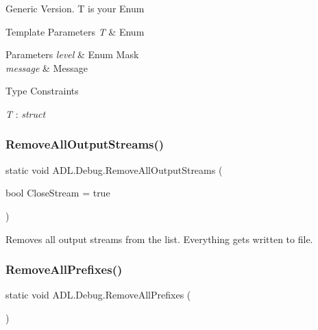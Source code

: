 Generic Version. T is your Enum 


\begin{DoxyTemplParams}{Template Parameters}
{\em T} & Enum\\
\hline
\end{DoxyTemplParams}

\begin{DoxyParams}{Parameters}
{\em level} & Enum Mask\\
\hline
{\em message} & Message\\
\hline
\end{DoxyParams}
\begin{Desc}
\item[Type Constraints]\begin{description}
\item[{\em T} : {\em struct}]\end{description}
\end{Desc}
\mbox{\label{class_a_d_l_1_1_debug_adae2e77eb29191dc812b8875bd1ebd57}} 
\subsubsection{\texorpdfstring{Remove\+All\+Output\+Streams()}{RemoveAllOutputStreams()}}
{\footnotesize\ttfamily static void A\+D\+L.\+Debug.\+Remove\+All\+Output\+Streams (\begin{DoxyParamCaption}\item[{bool}]{Close\+Stream = {\ttfamily true} }\end{DoxyParamCaption})\hspace{0.3cm}{\ttfamily [static]}}



Removes all output streams from the list. Everything gets written to file. 

\mbox{\label{class_a_d_l_1_1_debug_a55a298962d5f05d55c5b3b045e7f6fe7}} 
\subsubsection{\texorpdfstring{Remove\+All\+Prefixes()}{RemoveAllPrefixes()}}
{\footnotesize\ttfamily static void A\+D\+L.\+Debug.\+Remove\+All\+Prefixes (\begin{DoxyParamCaption}{ }\end{DoxyParamCaption})\hspace{0.3cm}{\ttfamily [static]}}



